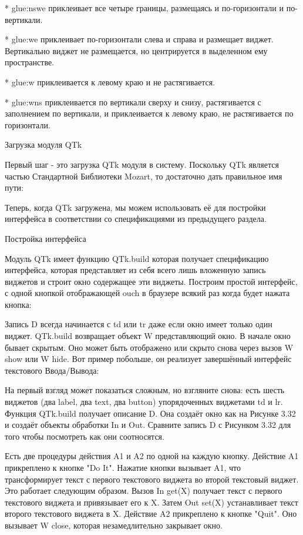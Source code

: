 * glue:nswe приклеивает все четыре границы, размещаясь и по-горизонтали и по-вертикали.

* glue:we приклеивает по-горизонтали слева и справа и размещает виджет. Вертикально виджет не размещается, но центрируется в выделенном ему пространстве.

* glue:w приклеивается к левому краю и не растягивается.

* glue:wns приклеивается по вертикали сверху и снизу, растягивается с заполнением по вертикали, и приклеивается к левому краю, не растягивается по горизонтали.

Загрузка модуля QTk

Первый шаг - это загрузка QTk модуля в систему. Поскольку QTk является частью Стандартной Библиотеки Mozart, то достаточно дать правильное имя пути:

Теперь, когда QTk загружена, мы можем использовать её для постройки интерфейса в соответствии со спецификациями из предыдущего раздела.

Постройка интерфейса

Модуль QTk имеет функцию QTk.build которая получает спецификацию интерфейса, которая представляет из себя всего лишь вложенную запись виджетов и строит окно содержащее эти виджеты. Построим простой интерфейс, с одной кнопкой отображающей ouch в браузере всякий раз когда будет нажата кнопка:

Запись D всегда начинается с td или tr даже если окно имеет только один виджет. QTk.build возвращает объект W представляющий окно. В начале окно бывает скрытым. Оно может быть отображено или скрыто снова через вызов {W show} или {W hide}. Вот пример побольше, он реализует завершённый интерфейс текстового Ввода/Вывода:

На первый взгляд может показаться сложным, но взгляните снова: есть шесть виджетов (два label, два text, два button) упорядоченных виджетами td и lr. Функция QTk.build получает описание D. Она создаёт окно как на Рисунке 3.32 и создаёт объекты обработки In и Out. Сравните запись D с Рисунком 3.32 для того чтобы посмотреть как они соотносятся.

Есть две процедуры действия A1 и A2 по одной на каждую кнопку. Действие A1 прикреплено к кнопке "Do It". Нажатие кнопки вызывает A1, что трансформирует текст с первого текстового виджета во второй текстовый виджет. Это работает следующим образом. Вызов {In get(X)} получает текст с первого текстового виджета и привязывает его к X. Затем {Out set(X)} устанавливает текст второго текстового виджета в X. Действие A2 прикреплено к кнопке "Quit". Оно вызывает {W close}, которая незамедлительно закрывает окно.

